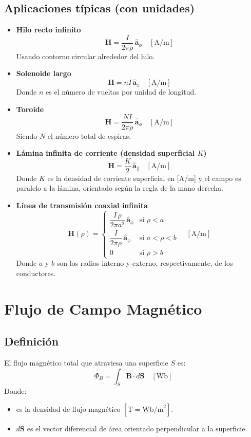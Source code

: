 \documentclass[11pt]{article}
\begin{document}
\subsection*{Aplicaciones típicas (con unidades)}
\begin{itemize}
  \item \textbf{Hilo recto infinito}  
        \[
        \mathbf{H} = \frac{I}{2\pi {\rho}}\,\hat{\boldsymbol{a}}_{\phi} \quad [\text{A/m}]
        \]
        Usando contorno circular alrededor del hilo.

  \item \textbf{Solenoide largo}  
        \[
        \mathbf{H} = nI\,\hat{\boldsymbol{a}}_{z} \quad [\text{A/m}]
        \]
        Donde \(n\) es el número de vueltas por unidad de longitud.

  \item \textbf{Toroide}  
        \[
        \mathbf{H} = \frac{NI}{2\pi {\rho}}\,\hat{\boldsymbol{a}}_{\phi} \quad [\text{A/m}]
        \]
        Siendo \(N\) el número total de espiras.

  \item \textbf{Lámina infinita de corriente (densidad superficial \(K\))}  
        \[
        \mathbf{H} = \frac{K}{2}\,\hat{\boldsymbol{a}}_{\parallel} \quad [\text{A/m}]
        \]
        Donde \(K\) es la densidad de corriente superficial en [A/m] y el campo es paralelo a la lámina, orientado según la regla de la mano derecha.

  \item \textbf{Línea de transmisión coaxial infinita}  
        \[
        \mathbf{H}({\rho}) = 
        \begin{cases}
        \dfrac{I\,{\rho}}{2\pi a^{2}}\,\hat{\boldsymbol{a}}_{\phi} & \text{si } {\rho} < a \\
        \dfrac{I}{2\pi {\rho}}\,\hat{\boldsymbol{a}}_{\phi} & \text{si } a < {\rho} < b \\
        0 & \text{si } {\rho} > b
        \end{cases}
        \quad [\text{A/m}]
        \]
        Donde \(a\) y \(b\) son los radios interno y externo, respectivamente, de los conductores.
\end{itemize}

\section{Flujo de Campo Magnético}
\subsection*{Definición}
El flujo magnético total que atraviesa una superficie \(S\) es:
\[
\Phi_{B} = \int_{S} \mathbf{B} \cdot d\mathbf{S}
\quad [\text{Wb}]
\]
Donde:
\begin{itemize}
  \item {} es la densidad de flujo magnético \([\text{T} = \text{Wb/m}^2]\).
  \item \(d\mathbf{S}\) es el vector diferencial de área orientado perpendicular a la superficie.
\end{itemize}
\end{document}
